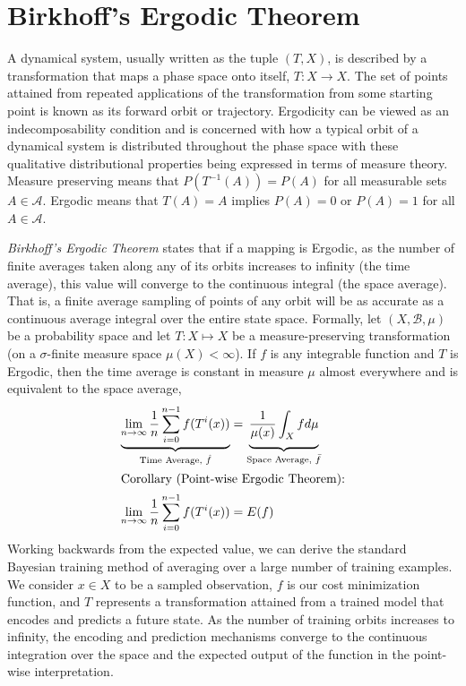 \documentclass{article}
\begin{document}
\section{Birkhoff's Ergodic Theorem}
A dynamical system, usually written as the tuple $(T, X)$, is described by a transformation that maps a phase space onto itself, $T: X \to X$. The set of points attained from repeated applications of the transformation from some starting point is known as its forward orbit or trajectory. Ergodicity can be viewed as an indecomposability condition and is concerned with how a typical orbit of a dynamical system is distributed throughout the phase space with these qualitative distributional properties being expressed in terms of measure theory. Measure preserving means that $P(T^{-1}(A)) = P(A)$ for all measurable sets $A \in \mathcal A$. Ergodic means that $T(A) = A$
implies $P(A) = 0$ or $P(A) = 1$ for all $A \in \mathcal A$.

\textit{Birkhoff's Ergodic Theorem} states that if a mapping is Ergodic, as the number of finite averages taken along any of its orbits increases to infinity (the time average), this value will converge to the continuous integral (the space average). That is, a finite average sampling of points of any orbit will be as accurate as a continuous average integral over the entire state space.  Formally, let $(X, \mathcal{B}, \mu)$ be a probability space and let $T : X \mapsto X$ be a measure-preserving transformation (on a $\sigma$-finite measure space $\mu(X)< \infty$). If $f$ is any integrable function and $T$ is Ergodic, then the time average is constant in measure $\mu$ almost everywhere and is equivalent to the space average,
\begin{align*}
    \underbrace{
        \lim_{n\to \infty} \frac{1}{n}\sum_{i=0}^{n-1}f(T^{i}(x))
    }_\textrm{Time Average, $\hat f$} 
    &=  \underbrace{
        \vphantom{ \sum_{i=0}^{n-1} }
        \frac{1}{\mu(x)} \int_{X} f d \mu
    }_\textrm{Space Average, $\bar f$}\\
    \intertext{Corollary (Point-wise Ergodic Theorem):}
        \lim_{n\to \infty} \frac{1}{n}\sum_{i=0}^{n-1}f(T^{i}(x))
    &=  
        \vphantom{ \sum_{i=0}^{n-1} }
        E(f)
\end{align*}
Working backwards from the expected value, we can derive the standard Bayesian training method of averaging over a large number of training examples.  We consider $x \in X$ to be a sampled observation, $f$ is our cost minimization function, and $T$ represents a transformation attained from a trained model that encodes and predicts a future state. As the number of training orbits increases to infinity, the encoding and prediction mechanisms converge to the continuous integration over the space and the expected output of the function in the point-wise interpretation.
\end{document}
